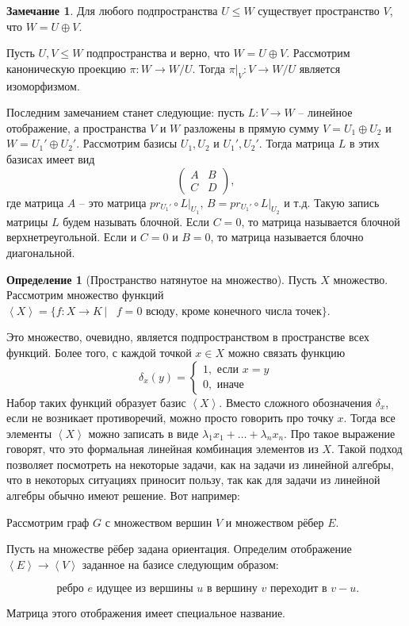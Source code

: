 \documentclass[10pt,a4paper,oneside]{book} %
\theoremstyle{definition}
\newtheorem*{rem}{Замечание}
\newtheorem*{defn}{Определение}
\def\lan{\left\langle }
\def\ran{\right\rangle}
\def\dfn{\begin{defn}}
\def\edfn{\end{defn}}
\def\rm{\begin{rem}}
\def\erm{\end{rem}}
\def\pmat{\begin{pmatrix}}
\def\epmat{\end{pmatrix}}
\begin{document}
\rm Для любого подпространства $U \leq W$ существует пространство $V$, что $W=U\oplus V$.

  Пусть $U,V\leq W$ подпространства и верно, что $W=U\oplus V$. Рассмотрим каноническую проекцию $\pi \colon W \to W/U$. Тогда $\pi|_{V} \colon V \to W/U$ является изоморфизмом.
\erm

Последним замечанием станет следующие: пусть $L\colon V \to W$ -- линейное отображение, а пространства $V$ и $W$ разложены в прямую сумму $V=U_1\oplus U_2 $ и $W=U_1'\oplus U_2'$. Рассмотрим базисы  $U_1, U_2$ и $U_1', U_2'$. Тогда матрица $L$ в этих базисах имеет вид
$$ \pmat A& B \\
C & D
\epmat,
$$
где матрица $A$ -- это матрица $pr_{U_1'}\circ L|_{U_1}$, $B=pr_{U_1'}\circ L |_{U_2}$ и т.д. Такую запись матрицы $L$ будем называть блочной. Если $C=0$, то матрица называется блочной верхнетреугольной. Если и $C=0$ и $B=0$, то матрица называется блочно диагональной.


\dfn[Пространство натянутое на множество]
Пусть $X$ множество. Рассмотрим множество функций $\lan X \ran = \{ f\colon X \to K\,|\, \text{ $f=0$ всюду, кроме конечного числа точек} \}$.
\edfn

Это множество, очевидно, является подпространством в пространстве всех функций. Более того, с каждой точкой $x\in X$ можно связать функцию $$\delta_x(y)=\begin{cases} 1, \text{ если  $x=y$} \\
0, \text{ иначе }
\end{cases}$$
Набор таких функций образует базис $\lan X \ran$. Вместо сложного обозначения $\delta_x$, если не возникает противоречий, можно просто говорить про точку $x$. Тогда все элементы $\lan X \ran $ можно записать в виде $\lambda_1 x_1+\dots +\lambda_n x_n$. Про такое выражение говорят, что это формальная линейная комбинация элементов из $X$. Такой подход позволяет посмотреть на некоторые задачи, как на задачи из линейной алгебры, что в некоторых ситуациях приносит пользу, так как для задачи из линейной алгебры обычно имеют решение. Вот например:

Рассмотрим граф $G$ с множеством вершин $V$ и множеством рёбер $E$.

Пусть на множестве рёбер задана ориентация. Определим отображение $\lan E \ran \to \lan V \ran$ заданное на базисе следующим образом:

$$\text{ ребро $e$ идущее из вершины $u$ в вершину $v$ переходит в $v-u$}.$$

Матрица этого отображения имеет специальное название.
\end{document}
